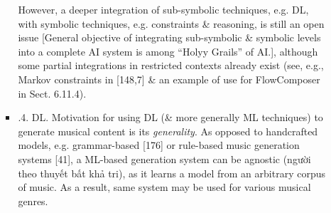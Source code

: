 \documentclass{article}
\begin{document}
\begin{itemize}
\begin{itemize}
\begin{itemize}
			However, a deeper integration of sub-symbolic techniques, e.g. DL, with symbolic techniques, e.g. constraints \& reasoning, is still an open issue [General objective of integrating sub-symbolic \& symbolic levels into a complete AI system is among ``Holyy Grails'' of AI.], although some partial integrations in restricted contexts already exist (see, e.g., Markov constraints in [148,7] \& an example of use for FlowComposer in Sect. 6.11.4).
			\item {.4. DL.} Motivation for using DL (\& more generally ML techniques) to generate musical content is its {\it generality}. As opposed to handcrafted models, e.g. grammar-based [176]  or rule-based music generation systems [41], a ML-based generation system can be agnostic (người theo thuyết bất khả tri), as it learns a model from an arbitrary corpus of music. As a result, same system may be used for various musical genres.
			

\end{itemize}
\end{itemize}
\end{itemize}
\end{document}
